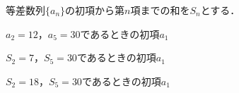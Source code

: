 \documentclass[../../../../uem_mat_mei_q.tex]{subfiles}
\begin{document}
    等差数列$\{a_n\}$の初項から第$n$項までの和を$S_n$とする．

    \myspacea$a_2=12$，$a_5=30$であるときの初項$a_1$

    \myspacea$S_2=7$，$S_5=30$であるときの初項$a_1$
    
    \myspacea$S_2=18$，$S_5=30$であるときの初項$a_1$
\end{document}
